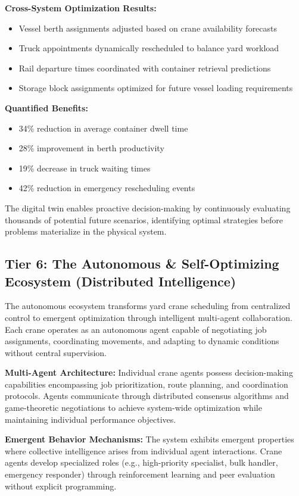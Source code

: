 \documentclass{article}
\begin{document}
\textbf{Cross-System Optimization Results:}
\begin{itemize}
\item Vessel berth assignments adjusted based on crane availability forecasts
\item Truck appointments dynamically rescheduled to balance yard workload  
\item Rail departure times coordinated with container retrieval predictions
\item Storage block assignments optimized for future vessel loading requirements
\end{itemize}

\textbf{Quantified Benefits:}
\begin{itemize}
\item 34\% reduction in average container dwell time
\item 28\% improvement in berth productivity
\item 19\% decrease in truck waiting times
\item 42\% reduction in emergency rescheduling events
\end{itemize}

The digital twin enables proactive decision-making by continuously evaluating thousands of potential future scenarios, identifying optimal strategies before problems materialize in the physical system.

\subsection{Tier 6: The Autonomous \& Self-Optimizing Ecosystem (Distributed Intelligence)}

The autonomous ecosystem transforms yard crane scheduling from centralized control to emergent optimization through intelligent multi-agent collaboration. Each crane operates as an autonomous agent capable of negotiating job assignments, coordinating movements, and adapting to dynamic conditions without central supervision.

\textbf{Multi-Agent Architecture:} Individual crane agents possess decision-making capabilities encompassing job prioritization, route planning, and coordination protocols. Agents communicate through distributed consensus algorithms and game-theoretic negotiations to achieve system-wide optimization while maintaining individual performance objectives.

\textbf{Emergent Behavior Mechanisms:} The system exhibits emergent properties where collective intelligence arises from individual agent interactions. Crane agents develop specialized roles (e.g., high-priority specialist, bulk handler, emergency responder) through reinforcement learning and peer evaluation without explicit programming.
\end{document}
